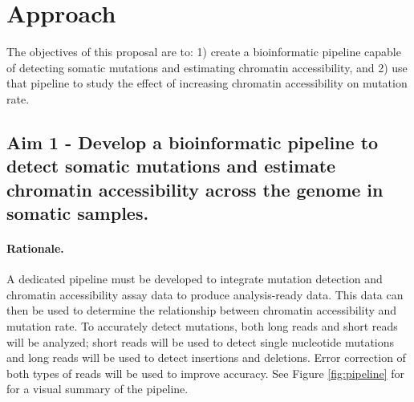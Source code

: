 



\section{Approach}
The objectives of this proposal are to: 1) create a bioinformatic pipeline capable of detecting somatic mutations and estimating chromatin accessibility, and 2) use that pipeline to study the effect of increasing chromatin accessibility on mutation rate.

\subsection{Aim 1 - Develop a bioinformatic pipeline to detect somatic mutations and estimate chromatin accessibility across the genome in somatic samples.}
\paragraph{Rationale.}
A dedicated pipeline must be developed to integrate mutation detection and chromatin accessibility assay data to produce analysis-ready data. This data can then be used to determine the relationship between chromatin accessibility and mutation rate.
To accurately detect mutations, both long reads and short reads will be analyzed; short reads will be used to detect single nucleotide mutations and long reads will be used to detect insertions and deletions. Error correction of both types of reads will be used to improve accuracy.
See Figure \ref{fig:pipeline} for for a visual summary of the pipeline.

